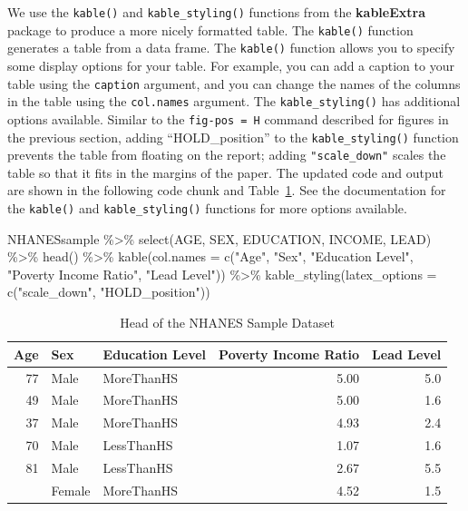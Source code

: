 \documentclass[
  letterpaper,
]{latex/krantz}
\makeatletter
\newenvironment{Shaded}{\begin{snugshade}}{\end{snugshade}}
\newcommand{\AttributeTok}[1]{\textcolor[rgb]{0.40,0.45,0.13}{#1}}
\newcommand{\FunctionTok}[1]{\textcolor[rgb]{0.28,0.35,0.67}{#1}}
\newcommand{\NormalTok}[1]{\textcolor[rgb]{0.00,0.23,0.31}{#1}}
\newcommand{\SpecialCharTok}[1]{\textcolor[rgb]{0.37,0.37,0.37}{#1}}
\newcommand{\StringTok}[1]{\textcolor[rgb]{0.13,0.47,0.30}{#1}}
\newenvironment{kframe}{%
\medskip{}
\setlength{\fboxsep}{.8em}
 \def\at@end@of@kframe{}%
 \ifinner\ifhmode%
  \def\at@end@of@kframe{\end{minipage}}%
  \begin{minipage}{\columnwidth}%
 \fi\fi%
 \def\FrameCommand##1{\hskip\@totalleftmargin \hskip-\fboxsep
 \colorbox{shadecolor}{##1}\hskip-\fboxsep
     \hskip-\linewidth \hskip-\@totalleftmargin \hskip\columnwidth}%
 \MakeFramed {\advance\hsize-\width
   \@totalleftmargin\z@ \linewidth\hsize
   \@setminipage}}%
 {\par\unskip\endMakeFramed%
 \at@end@of@kframe}
\renewenvironment{Shaded}{\begin{kframe}}{\end{kframe}}
\makeatother
\begin{document}
We use the \texttt{kable()}
and
\texttt{kable\_styling()}
functions from the \textbf{kableExtra} package to produce a more nicely
formatted table. The \texttt{kable()} function generates a table from a
data frame. The \texttt{kable()} function allows you to specify some
display options for your table. For example, you can add a caption to
your table using the \texttt{caption} argument, and you can change the
names of the columns in the table using the \texttt{col.names} argument.
The \texttt{kable\_styling()} has additional options available. Similar
to the \texttt{fig-pos\ =\ H} command described for figures in the
previous section, adding ``HOLD\_position'' to the
\texttt{kable\_styling()} function prevents the table from floating on
the report; adding \texttt{"scale\_down"} scales the table so that it
fits in the margins of the paper. The updated code and output are shown
in the following code chunk and Table~\ref{tbl-kable-ex}. See the
documentation for the \texttt{kable()} and \texttt{kable\_styling()}
functions for more options available.

\begin{Shaded}
\begin{Highlighting}[]
\NormalTok{NHANESsample }\SpecialCharTok{\%\textgreater{}\%} 
  \FunctionTok{select}\NormalTok{(AGE, SEX, EDUCATION, INCOME, LEAD) }\SpecialCharTok{\%\textgreater{}\%} 
  \FunctionTok{head}\NormalTok{() }\SpecialCharTok{\%\textgreater{}\%} 
  \FunctionTok{kable}\NormalTok{(}\AttributeTok{col.names =} \FunctionTok{c}\NormalTok{(}\StringTok{"Age"}\NormalTok{, }\StringTok{"Sex"}\NormalTok{, }\StringTok{"Education Level"}\NormalTok{, }
                      \StringTok{"Poverty Income Ratio"}\NormalTok{, }\StringTok{"Lead Level"}\NormalTok{)) }\SpecialCharTok{\%\textgreater{}\%}   
  \FunctionTok{kable\_styling}\NormalTok{(}\AttributeTok{latex\_options =} \FunctionTok{c}\NormalTok{(}\StringTok{"scale\_down"}\NormalTok{, }\StringTok{"HOLD\_position"}\NormalTok{))}
\end{Highlighting}
\end{Shaded}

\begin{longtable}[t]{rllrr}

\caption{\label{tbl-kable-ex}Head of the NHANES Sample Dataset}

\tabularnewline

\toprule
Age & Sex & Education Level & Poverty Income Ratio & Lead Level\\
\midrule
77 & Male & MoreThanHS & 5.00 & 5.0\\
49 & Male & MoreThanHS & 5.00 & 1.6\\
37 & Male & MoreThanHS & 4.93 & 2.4\\
70 & Male & LessThanHS & 1.07 & 1.6\\
81 & Male & LessThanHS & 2.67 & 5.5\\
\addlinespace
38 & Female & MoreThanHS & 4.52 & 1.5\\
\bottomrule

\end{longtable}
\end{document}
